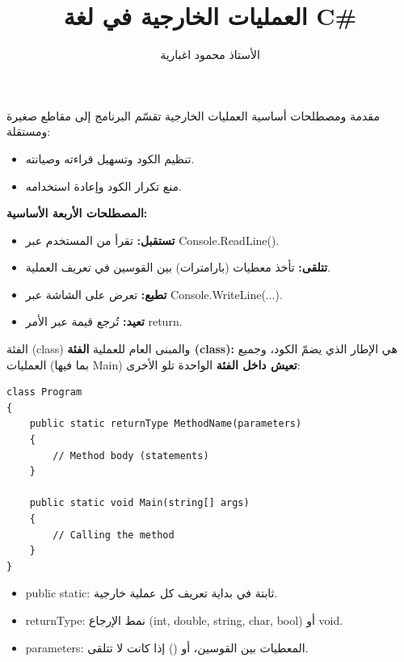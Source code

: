 \documentclass[13pt]{beamer}
\title{العمليات الخارجية في لغة \textenglish{C\#}}
\author{الأستاذ محمود اغبارية}
\date{}
\begin{document}
\begin{frame}
  \titlepage
\end{frame}

\begin{frame}[fragile]{مقدمة ومصطلحات أساسية}
العمليات الخارجية تقسّم البرنامج إلى مقاطع صغيرة ومستقلة:
\begin{itemize}
  \item تنظيم الكود وتسهيل قراءته وصيانته.
  \item منع تكرار الكود وإعادة استخدامه.
\end{itemize}
\vspace{0.4em}
\textbf{المصطلحات الأربعة الأساسية:}
\begin{itemize}
  \item \textbf{تستقبل:} تقرأ من المستخدم عبر \textenglish{Console.ReadLine()}.
  \item \textbf{تتلقى:} تأخذ معطيات (بارامترات) بين القوسين في تعريف العملية.
  \item \textbf{تطبع:} تعرض على الشاشة عبر \textenglish{Console.WriteLine(...)}.
  \item \textbf{تعيد:} تُرجع قيمة عبر الأمر \textenglish{return}.
\end{itemize}
\end{frame}

\begin{frame}[fragile]{الفئة (\textenglish{class}) والمبنى العام للعملية}
\textbf{الفئة (\textenglish{class}):} هي الإطار الذي يضمّ الكود، وجميع العمليات (بما فيها \textenglish{Main}) \textbf{تعيش داخل الفئة} الواحدة تلو الأخرى:
\begin{english}
\begin{lstlisting}[language=CSharp, basicstyle=\ttfamily\footnotesize]
class Program
{
    public static returnType MethodName(parameters)
    {
        // Method body (statements)
    }

    public static void Main(string[] args)
    {
        // Calling the method
    }
}
\end{lstlisting}
\end{english}
\begin{itemize}
  \item \textenglish{public static}: ثابتة في بداية تعريف كل عملية خارجية.
  \item \textenglish{returnType}: نمط الإرجاع (\textenglish{int, double, string, char, bool}) أو \textenglish{void}.
  \item \textenglish{parameters}: المعطيات بين القوسين، أو \textenglish{()} إذا كانت لا تتلقى.
\end{itemize}
\end{frame}
\end{document}
